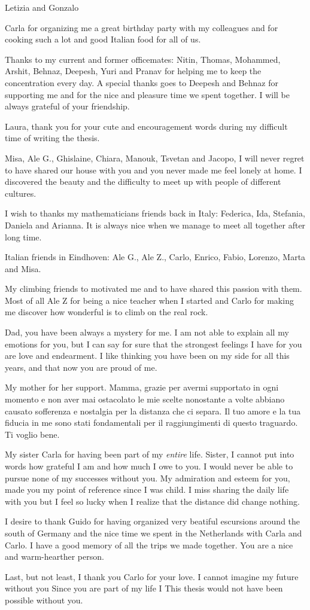 Letizia and Gonzalo 

Carla for organizing me a great birthday party with my colleagues and for cooking such a lot and good Italian food for all of us.

Thanks to my current and former officemates: Nitin, Thomas, Mohammed, Arshit, Behnaz, Deepesh, Yuri and Pranav for helping me to keep the concentration every day.
A  special thanks goes to Deepesh and Behnaz for supporting me and for the nice and pleasure time we spent together. I will be always grateful of your friendship. 

Laura, thank you for your cute and encouragement words during my difficult time of writing the thesis.

Misa, Ale G., Ghislaine, Chiara, Manouk, Tsvetan and Jacopo, I will never regret to have shared our house with you and you never made me feel lonely at home. I discovered the beauty and the difficulty to meet up with people of different cultures.

I wish to thanks my mathematicians friends back in Italy: Federica, Ida, Stefania, Daniela and Arianna. It is always nice when we manage to meet all together after long time.

Italian friends in Eindhoven: Ale G., Ale Z., Carlo, Enrico, Fabio, Lorenzo, Marta and Misa.

My climbing friends to motivated me and to have shared this passion with them. Most of all Ale Z for being a nice teacher when I started and Carlo for making me discover how wonderful is to climb on the real rock. 

Dad, you have been always a mystery for me. I am not able to explain all my emotions for you, but I can say for sure that the strongest feelings I have for you are love and endearment. 
I like thinking you have been on my side for all this years, and that now you are proud of me.

My mother for her support. Mamma, grazie per avermi supportato in ogni momento e non aver mai ostacolato le mie scelte nonostante a volte abbiano causato sofferenza e nostalgia per la distanza che ci separa. Il tuo amore e la tua fiducia in me sono stati fondamentali per il raggiungimenti di questo traguardo. Ti voglio bene.   

My sister Carla for having been part of my \textit{entire} life. Sister, I cannot put into words how grateful I am and how much I owe to you. 
I would never be able to pursue none of my successes without you.
My admiration and esteem for you, made you my point of reference since I was child. 
I miss sharing the daily life with you but I feel so lucky when I realize that the distance did change nothing. 

I desire to thank Guido for having organized very beatiful escursions around the south of Germany and the nice time we spent in the Netherlands with Carla and Carlo. I have a good memory of all the trips we made together. You are a nice and warm-hearther person.

Last, but not least, I thank you Carlo for your love. 
 I cannot imagine my future without you  Since you are part of my life I 
This thesis would not have been possible without you.
